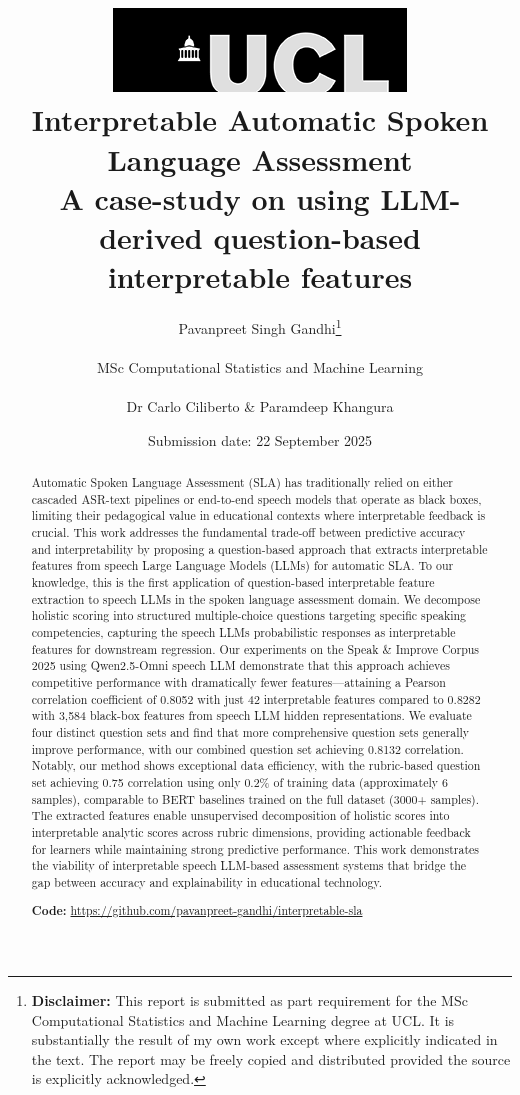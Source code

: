 \documentclass{report}
\title{{\includegraphics[scale=.5]{ucl_logo.png}}\\
{{\Huge Interpretable Automatic Spoken Language Assessment}}\\
{\large A case-study on using LLM-derived question-based interpretable features}\\}
\date{Submission date: 22 September 2025}
\author{Pavanpreet Singh Gandhi\thanks{
{\bf Disclaimer:}
This report is submitted as part requirement for the MSc Computational Statistics and Machine Learning degree at UCL. It is
substantially the result of my own work except where explicitly indicated in the text.
The report may be freely copied and distributed provided the source is explicitly acknowledged.}
\\ \\
MSc Computational Statistics and Machine Learning\\ \\
Dr Carlo Ciliberto \& Paramdeep Khangura}
\begin{document}
 
\onehalfspacing
\maketitle
\begin{abstract}
Automatic Spoken Language Assessment (SLA) has traditionally relied on either cascaded ASR-text pipelines or end-to-end speech models that operate as black boxes, limiting their pedagogical value in educational contexts where interpretable feedback is crucial. This work addresses the fundamental trade-off between predictive accuracy and interpretability by proposing a question-based approach that extracts interpretable features from speech Large Language Models (LLMs) for automatic SLA. To our knowledge, this is the first application of question-based interpretable feature extraction to speech LLMs in the spoken language assessment domain. We decompose holistic scoring into structured multiple-choice questions targeting specific speaking competencies, capturing the speech LLMs probabilistic responses as interpretable features for downstream regression. Our experiments on the Speak \& Improve Corpus 2025 using Qwen2.5-Omni speech LLM demonstrate that this approach achieves competitive performance with dramatically fewer features—attaining a Pearson correlation coefficient of 0.8052 with just 42 interpretable features compared to 0.8282 with 3,584 black-box features from speech LLM hidden representations. We evaluate four distinct question sets and find that more comprehensive question sets generally improve performance, with our combined question set achieving 0.8132 correlation. Notably, our method shows exceptional data efficiency, with the rubric-based question set achieving 0.75 correlation using only 0.2\% of training data (approximately 6 samples), comparable to BERT baselines trained on the full dataset (3000+ samples). The extracted features enable unsupervised decomposition of holistic scores into interpretable analytic scores across rubric dimensions, providing actionable feedback for learners while maintaining strong predictive performance. This work demonstrates the viability of interpretable speech LLM-based assessment systems that bridge the gap between accuracy and explainability in educational technology.

\textbf{Code:} \href{https://github.com/pavanpreet-gandhi/interpretable-sla}{https://github.com/pavanpreet-gandhi/interpretable-sla}
\end{abstract}
\tableofcontents
\setcounter{page}{1}
\end{document}
